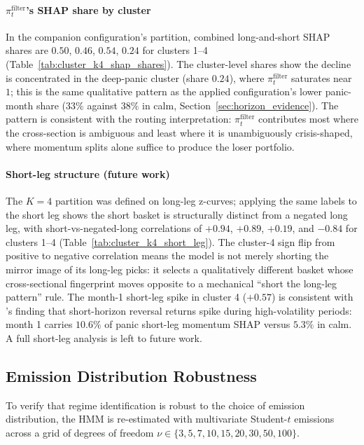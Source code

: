 \paragraph{$\pi_t^{\text{filter}}$'s SHAP share by cluster}
In the companion configuration's partition, combined long-and-short SHAP shares are $0.50$, $0.46$, $0.54$, $0.24$ for clusters 1--4 (Table~\ref{tab:cluster_k4_shap_shares}). The cluster-level shares show the decline is concentrated in the deep-panic cluster (share $0.24$), where $\pi_t^{\text{filter}}$ saturates near~$1$; this is the same qualitative pattern as the applied configuration's lower panic-month share ($33\%$ against $38\%$ in calm, Section~\ref{sec:horizon_evidence}). The pattern is consistent with the routing interpretation: $\pi_t^{\text{filter}}$ contributes most where the cross-section is ambiguous and least where it is unambiguously crisis-shaped, where momentum splits alone suffice to produce the loser portfolio.



\paragraph{Short-leg structure (future work)}
The $K=4$ partition was defined on long-leg z-curves; applying the same labels to the short leg shows the short basket is structurally distinct from a negated long leg, with short-vs-negated-long correlations of $+0.94$, $+0.89$, $+0.19$, and $-0.84$ for clusters 1--4 (Table~\ref{tab:cluster_k4_short_leg}). The cluster-4 sign flip from positive to negative correlation means the model is not merely shorting the mirror image of its long-leg picks: it selects a qualitatively different basket whose cross-sectional fingerprint moves opposite to a mechanical ``short the long-leg pattern'' rule. The month-1 short-leg spike in cluster 4 ($+0.57$) is consistent with \citet{Nagel2012}'s finding that short-horizon reversal returns spike during high-volatility periods: month 1 carries $10.6\%$ of panic short-leg momentum SHAP versus $5.3\%$ in calm. A full short-leg analysis is left to future work.



\subsection{Emission Distribution Robustness}\label{app:emission_robustness}

To verify that regime identification is robust to the choice of emission distribution, the HMM is re-estimated with multivariate Student-$t$ emissions across a grid of degrees of freedom $\nu \in \{3, 5, 7, 10, 15, 20, 30, 50, 100\}$.

